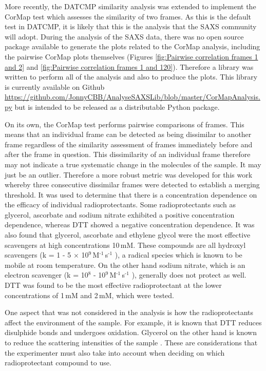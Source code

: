 More recently, the DATCMP similarity analysis was extended to implement the CorMap test which assesses the similarity of two frames.
As this is the default test in DATCMP, it is likely that this is the analysis that the SAXS community will adopt.
During the analysis of the SAXS data, there was no open source package available to generate the plots related to the CorMap analysis, including the pairwise CorMap plots themselves (Figures \ref{fig:Pairwise correlation frames 1 and 2} and \ref{fig:Pairwise correlation frames 1 and 120}).
Therefore a library was written to perform all of the analysis and also to produce the plots.
This library is currently available on Github \url{https://github.com/JonnyCBB/AnalyseSAXSLib/blob/master/CorMapAnalysis.py} but is intended to be released as a distributable Python package.

On its own, the CorMap test performs pairwise comparisons of frames.
This means that an individual frame can be detected as being dissimilar to another frame regardless of the similarity assessment of frames immediately before and after the frame in question.
This dissimilarity of an individual frame therefore may not indicate a true systematic change in the molecules of the sample.
It may just be an outlier.
Therefore a more robust metric was developed for this work whereby three consecutive dissimilar frames were detected to establish a merging threshold.
It was used to determine that there is a concentration dependence on the efficacy of individual radioprotectants. Some radioprotectants such as glycerol, ascorbate and sodium nitrate exhibited a positive concentration dependence, whereas DTT showed a negative concentration dependence.
It was also found that glycerol, ascorbate and ethylene glycol were the most effective scavengers at high concentrations 10$\,$mM.
These compounds are all hydroxyl scavengers (k = 1 - 5 $\times$ 10$^{\text{9}}\,$M$^{\text{-1}}\,$s$^{\text{-1}}$ \cite{garrison1987reaction}), a radical species which is known to be mobile at room temperature.
On the other hand sodium nitrate, which is an electron scavenger (k = 10$^{\text{8}}$ -  10$^{\text{9}}\,$M$^{\text{-1}}\,$s$^{\text{-1}}$ \cite{garrison1987reaction,allan2012}), generally does not protect as well.
DTT was found to be the most effective radioprotectant at the lower concentrations of 1$\,$mM and 2$\,$mM, which were tested.

One aspect that was not considered in the analysis is how the radioprotectants affect the environment of the sample.
For example, it is known that DTT reduces disulphide bonds and undergoes oxidation.
Glycerol on the other hand is known to reduce the scattering intensities of the sample \cite{jeffries2015limiting}.
These are considerations that the experimenter must also take into account when deciding on which radioprotectant compound to use.

